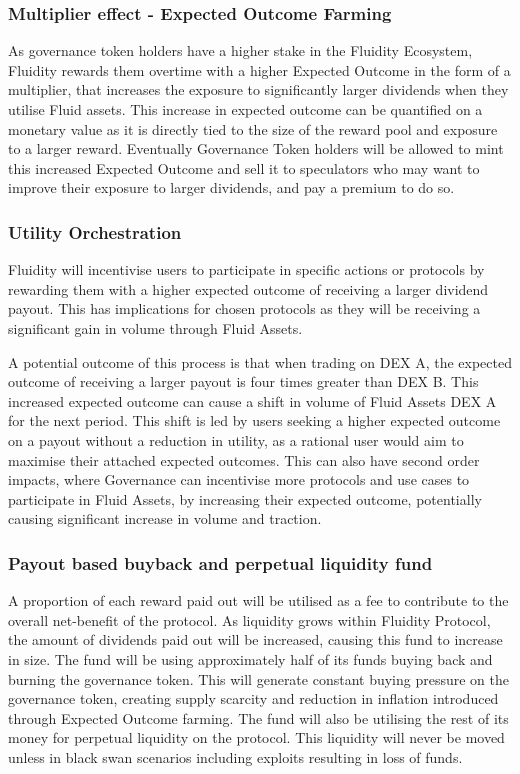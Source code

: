 \subsubsection{Multiplier effect - Expected Outcome Farming}

As governance token holders have a higher stake in the Fluidity Ecosystem, Fluidity rewards them overtime with a higher Expected Outcome in the form of a multiplier, that increases the exposure to significantly larger dividends when they utilise Fluid assets. This increase in expected outcome can be quantified on a monetary value as it is directly tied to the size of the reward pool and exposure to a larger reward. Eventually Governance Token holders will be allowed to mint this increased Expected Outcome and sell it to speculators who may want to improve their exposure to larger dividends, and pay a premium to do so.

\subsubsection{Utility Orchestration}

Fluidity will incentivise users to participate in specific actions or protocols by rewarding them with a higher expected outcome of receiving a larger dividend payout. This has implications for chosen protocols as they will be receiving a significant gain in volume through Fluid Assets. 

A potential outcome of this process is that when trading on DEX A, the expected outcome of receiving a larger payout is four times greater than DEX B. This increased expected outcome can cause a shift in volume of Fluid Assets DEX A for the next period. This shift is led by users seeking a higher expected outcome on a payout without a reduction in utility, as a rational user would aim to maximise their attached expected outcomes.
This can also have second order impacts, where Governance can incentivise more protocols and use cases to participate in Fluid Assets, by increasing their expected outcome, potentially causing significant increase in volume and traction.


\subsubsection{Payout based buyback and perpetual liquidity fund}


A proportion of each reward paid out will be utilised as a fee to contribute to the overall net-benefit of the protocol. As liquidity grows within Fluidity Protocol, the amount of dividends paid out will be increased, causing this fund to increase in size. The fund will be using approximately half of its funds buying back and burning the governance token. This will generate constant buying pressure on the governance token, creating supply scarcity and reduction in inflation introduced through Expected Outcome farming. The fund will also be utilising the rest of its money for perpetual liquidity on the protocol. This liquidity will never be moved unless in black swan scenarios including exploits resulting in loss of funds.

